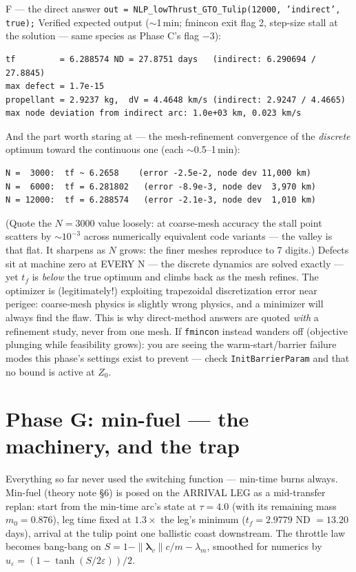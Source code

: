 \documentclass[11pt,letterpaper]{article}
\newcommand{\lamv}{\bm{\lambda}_v}
\newcommand{\lamm}{\lambda_m}
\begin{document}
\begin{checkpoint}{F --- the direct answer}
\texttt{out = NLP\_lowThrust\_GTO\_Tulip(12000, 'indirect', true);}
Verified expected output ($\sim$1\,min; fmincon exit flag 2, step-size
stall at the solution --- same species as Phase C's flag $-3$):
\begin{verbatim}
tf         = 6.288574 ND = 27.8751 days   (indirect: 6.290694 / 27.8845)
max defect = 1.7e-15
propellant = 2.9237 kg,  dV = 4.4648 km/s (indirect: 2.9247 / 4.4665)
max node deviation from indirect arc: 1.0e+03 km, 0.023 km/s
\end{verbatim}
And the part worth staring at --- the mesh-refinement convergence of the
\emph{discrete} optimum toward the continuous one (each $\sim$0.5--1\,min):
\begin{verbatim}
N =  3000:  tf ~ 6.2658    (error -2.5e-2, node dev 11,000 km)
N =  6000:  tf = 6.281802   (error -8.9e-3, node dev  3,970 km)
N = 12000:  tf = 6.288574   (error -2.1e-3, node dev  1,010 km)
\end{verbatim}
(Quote the $N{=}3000$ value loosely: at coarse-mesh accuracy the stall
point scatters by $\sim 10^{-3}$ across numerically equivalent code
variants --- the valley is that flat. It sharpens as $N$ grows: the finer
meshes reproduce to 7 digits.)
Defects sit at machine zero at EVERY N --- the discrete dynamics are
solved exactly --- yet $t_f$ is \emph{below} the true optimum and climbs
back as the mesh refines. The optimizer is (legitimately!) exploiting
trapezoidal discretization error near perigee: coarse-mesh physics is
slightly wrong physics, and a minimizer will always find the flaw. This is
why direct-method answers are quoted \emph{with} a refinement study, never
from one mesh.
If \texttt{fmincon} instead wanders off (objective plunging while
feasibility grows): you are seeing the warm-start/barrier failure modes
this phase's settings exist to prevent --- check \texttt{InitBarrierParam}
and that no bound is active at $Z_0$.
\end{checkpoint}

\section{Phase G: min-fuel --- the machinery, and the trap}

Everything so far never used the switching function --- min-time burns
always. Min-fuel (theory note \S6) is posed on the ARRIVAL LEG as a
mid-transfer replan: start from the min-time arc's state at
$\tau = 4.0$ (with its remaining mass $m_0 = 0.876$), leg time fixed at
$1.3\times$ the leg's minimum ($t_f = 2.9779$ ND $= 13.20$ days), arrival
at the tulip point one ballistic coast downstream. The throttle law
becomes bang-bang on $S = 1 - \|\lamv\|c/m - \lamm$, smoothed for
numerics by $u_\varepsilon = (1 - \tanh(S/2\varepsilon))/2$.
\end{document}
